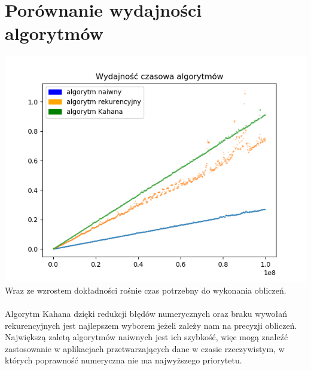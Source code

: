 \documentclass[11pt, a4paper]{article}
\begin{document}
\section{Porównanie wydajności algorytmów}

\includegraphics[scale = 0.7]{time_complex}\\
Wraz ze wzrostem dokładności rośnie czas potrzebny do wykonania obliczeń.\\\\ Algorytm Kahana dzięki redukcji błędów numerycznych oraz braku wywołań rekurencyjnych jest najlepszem wyborem jeżeli zależy nam na precyzji obliczeń. Największą zaletą algorytmów naiwnych jest ich szybkość, więc mogą znaleźć zastosowanie w aplikacjach przetwarzających dane w czasie rzeczywistym, w których poprawność numeryczna nie ma najwyższego priorytetu.
\end{document}
